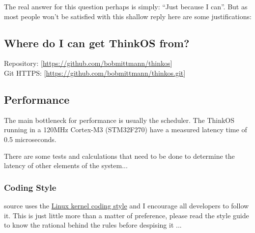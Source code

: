 The real answer for this question perhaps is simply: ``Just because I can''. But as most people won't be satisfied with this shallow reply here are some justifications:

\subsection{Where do I can get ThinkOS from?}

\begin{flushleft}
Repository: [\href{https://github.com/bobmittmann/thinkos}{https://github.com/bobmittmann/thinkos}]\\
Git HTTPS: [\href{https://github.com/bobmittmann/thinkos.git}{https://github.com/bobmittmann/thinkos.git}]
\end{flushleft}

\subsection{Performance}

The main bottleneck for performance is usually the scheduler. The ThinkOS running in a 120MHz Cortex-M3 (STM32F270) have a measured latency time of 0.5 microseconds.

There are some tests and calculations that need to be done to determine the latency of other elements of the system...

\subsubsection{Coding Style}

\ThinkOS source uses the \href{https://www.kernel.org/doc/html/v4.10/process/coding-style.html}{Linux kernel coding style} and I encourage all developers to follow it. This is just little more than a matter of preference, please read the style guide to know the rational behind the rules before despising it ...


